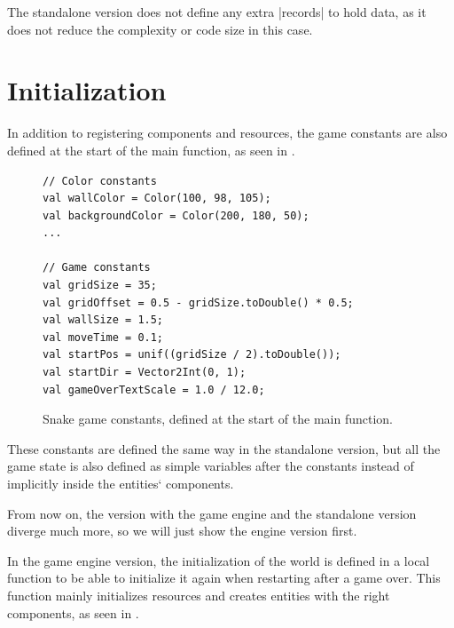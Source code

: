 The standalone version does not define any extra |records| to hold data, as it does not reduce the complexity or code size in this case.

\section{Initialization}

In addition to registering components and resources, the game constants are also defined at the start of the main function, as seen in .

\begin{figure}[h!]
\begin{lstlisting}
// Color constants
val wallColor = Color(100, 98, 105);
val backgroundColor = Color(200, 180, 50);
...

// Game constants
val gridSize = 35;
val gridOffset = 0.5 - gridSize.toDouble() * 0.5;
val wallSize = 1.5;
val moveTime = 0.1;
val startPos = unif((gridSize / 2).toDouble());
val startDir = Vector2Int(0, 1);
val gameOverTextScale = 1.0 / 12.0;
\end{lstlisting}
\caption{Snake game constants, defined at the start of the main function.}
\label{fig:caseconstants}
\end{figure}

These constants are defined the same way in the standalone version, but all the game state is also defined as simple variables after the constants instead of implicitly inside the entities` components.

From now on, the version with the game engine and the standalone version diverge much more, so we will just show the engine version first.

In the game engine version, the initialization of the world is defined in a local function to be able to initialize it again when restarting after a game over. This function mainly initializes resources and creates entities with the right components, as seen in .

